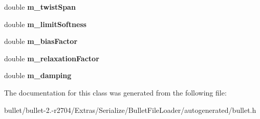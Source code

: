 \begin{DoxyCompactItemize}
\item 
\hypertarget{class_bullet_1_1bt_cone_twist_constraint_double_data_ad53d54042a9e397e8a5204b0cb5dc6ac}{double {\bfseries m\+\_\+twist\+Span}}\label{class_bullet_1_1bt_cone_twist_constraint_double_data_ad53d54042a9e397e8a5204b0cb5dc6ac}

\item 
\hypertarget{class_bullet_1_1bt_cone_twist_constraint_double_data_a5b42aa5e7b75765db56aad2031fa8547}{double {\bfseries m\+\_\+limit\+Softness}}\label{class_bullet_1_1bt_cone_twist_constraint_double_data_a5b42aa5e7b75765db56aad2031fa8547}

\item 
\hypertarget{class_bullet_1_1bt_cone_twist_constraint_double_data_a0210be19da9ad47330560dfc4647c65b}{double {\bfseries m\+\_\+bias\+Factor}}\label{class_bullet_1_1bt_cone_twist_constraint_double_data_a0210be19da9ad47330560dfc4647c65b}

\item 
\hypertarget{class_bullet_1_1bt_cone_twist_constraint_double_data_a9565425ea46dc62b966c561568f73797}{double {\bfseries m\+\_\+relaxation\+Factor}}\label{class_bullet_1_1bt_cone_twist_constraint_double_data_a9565425ea46dc62b966c561568f73797}

\item 
\hypertarget{class_bullet_1_1bt_cone_twist_constraint_double_data_aee36175b8519c194e5fd8510a613747b}{double {\bfseries m\+\_\+damping}}\label{class_bullet_1_1bt_cone_twist_constraint_double_data_aee36175b8519c194e5fd8510a613747b}

\end{DoxyCompactItemize}


The documentation for this class was generated from the following file\+:\begin{DoxyCompactItemize}
\item 
bullet/bullet-\/2.-\/r2704/\+Extras/\+Serialize/\+Bullet\+File\+Loader/autogenerated/bullet.\+h\end{DoxyCompactItemize}
